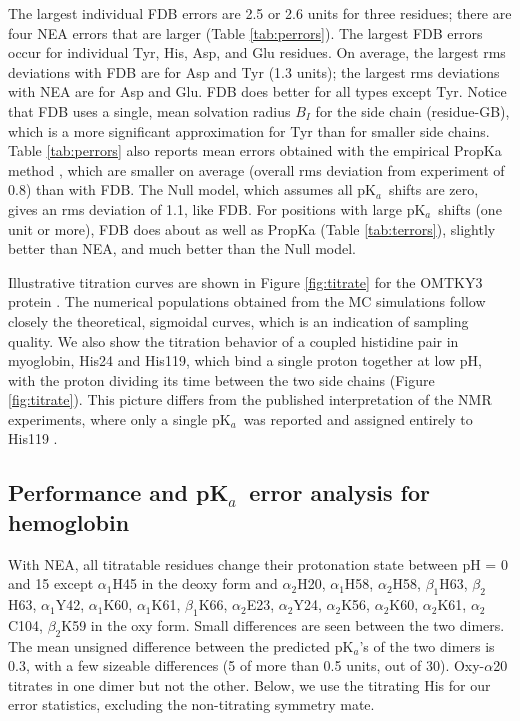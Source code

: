 \documentclass[a4paper,12pt]{article}
\newcommand{\pk}{pK$_a$}
\begin{document}
The largest individual FDB errors are 2.5 or 2.6 units for three residues; there are four NEA errors
that are larger (Table \ref{tab:perrors}). The largest FDB errors occur for individual Tyr, His, Asp,
and Glu residues. On average, the largest rms deviations with FDB are for Asp and Tyr (1.3 units); the
largest rms deviations with NEA are for Asp and Glu. FDB does better for all types except Tyr. Notice
that FDB uses a single, mean solvation radius $B_I$ for the side chain (residue-GB), which is a more
significant approximation for Tyr than for smaller side chains.
Table \ref{tab:perrors} also reports mean errors obtained with the empirical PropKa method \cite{Bas08,
Olsson11a}, which are smaller on average (overall rms deviation from experiment of 0.8) than with FDB.
The Null model, which assumes all \pk\ shifts are zero, gives an rms deviation of 1.1, like FDB. For
positions with large \pk\ shifts (one unit or more), FDB does about as well as PropKa (Table
\ref{tab:terrors}), slightly better than NEA, and much better than the Null model.

Illustrative titration curves are shown in Figure \ref{fig:titrate} for the OMTKY3 protein . The numerical
populations obtained from the MC simulations follow closely the theoretical, sigmoidal curves, which is an
indication of sampling quality. We also show the titration behavior of a coupled histidine pair in myoglobin,
His24 and His119, which bind a single proton together at low pH, with the proton dividing its time between
the two side chains (Figure \ref{fig:titrate}). This picture differs from the published interpretation of the
NMR experiments, where only a single \pk\ was reported and assigned entirely to His119 \cite{Bashford93}.

\subsection{Performance and \pk\ error analysis for hemoglobin}
With NEA, all titratable residues change their protonation state between pH = 0 and 15 except $\alpha_1$H45
in the deoxy form and $\alpha_2$H20, $\alpha_1$H58, $\alpha_2$H58, $\beta_1$H63, $\beta_2$H63, $\alpha_1$Y42,
$\alpha_1$K60, $\alpha_1$K61, $\beta_1$K66, $\alpha_2$E23, $\alpha_2$Y24, $\alpha_2$K56, $\alpha_2$K60,
$\alpha_2$K61, $\alpha_2$C104, $\beta_2$K59 in the oxy form. Small differences are seen between the two
dimers. The mean unsigned difference between the predicted \pk's of the two dimers is 0.3, with a few
sizeable differences (5 of more than 0.5 units, out of 30). Oxy-$\alpha$20 titrates in one dimer but not
the other. Below, we use the titrating His for our error statistics, excluding the non-titrating symmetry mate.
\end{document}
